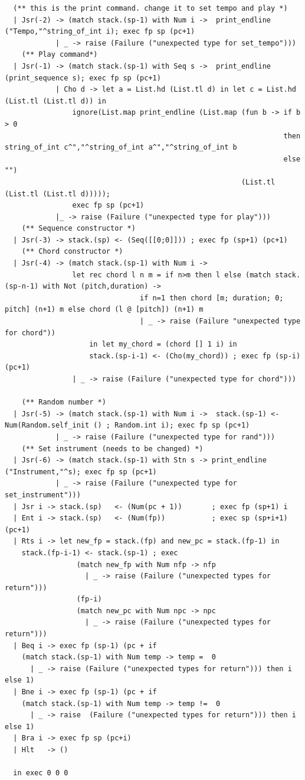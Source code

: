 \documentclass[12pt,A4]{book}
\begin{document}
\begin{verbatim}
  (** this is the print command. change it to set tempo and play *)
  | Jsr(-2) -> (match stack.(sp-1) with Num i ->  print_endline ("Tempo,"^string_of_int i); exec fp sp (pc+1)
            | _ -> raise (Failure ("unexpected type for set_tempo")))
    (** Play command*)
  | Jsr(-1) -> (match stack.(sp-1) with Seq s ->  print_endline (print_sequence s); exec fp sp (pc+1)
            | Cho d -> let a = List.hd (List.tl d) in let c = List.hd (List.tl (List.tl d)) in
                ignore(List.map print_endline (List.map (fun b -> if b > 0 
                                                                  then string_of_int c^","^string_of_int a^","^string_of_int b 
                                                                  else "") 
                                                        (List.tl (List.tl (List.tl d)))));
                exec fp sp (pc+1)
            |_ -> raise (Failure ("unexpected type for play")))
    (** Sequence constructor *)
  | Jsr(-3) -> stack.(sp) <- (Seq([[0;0]])) ; exec fp (sp+1) (pc+1)
    (** Chord constructor *)
  | Jsr(-4) -> (match stack.(sp-1) with Num i ->
                let rec chord l n m = if n>m then l else (match stack.(sp-n-1) with Not (pitch,duration) ->
                                if n=1 then chord [m; duration; 0; pitch] (n+1) m else chord (l @ [pitch]) (n+1) m
                                | _ -> raise (Failure "unexpected type for chord"))
                    in let my_chord = (chord [] 1 i) in
                    stack.(sp-i-1) <- (Cho(my_chord)) ; exec fp (sp-i) (pc+1)
                | _ -> raise (Failure ("unexpected type for chord")))

    (** Random number *)
  | Jsr(-5) -> (match stack.(sp-1) with Num i ->  stack.(sp-1) <- Num(Random.self_init () ; Random.int i); exec fp sp (pc+1)
            | _ -> raise (Failure ("unexpected type for rand")))
    (** Set instrument (needs to be changed) *)
  | Jsr(-6) -> (match stack.(sp-1) with Stn s -> print_endline ("Instrument,"^s); exec fp sp (pc+1)
			| _ -> raise (Failure ("unexpected type for set_instrument")))
  | Jsr i -> stack.(sp)   <- (Num(pc + 1))       ; exec fp (sp+1) i
  | Ent i -> stack.(sp)   <- (Num(fp))           ; exec sp (sp+i+1) (pc+1)
  | Rts i -> let new_fp = stack.(fp) and new_pc = stack.(fp-1) in
    stack.(fp-i-1) <- stack.(sp-1) ; exec 
                 (match new_fp with Num nfp -> nfp  
                   | _ -> raise (Failure ("unexpected types for return"))) 
                 (fp-i) 
                 (match new_pc with Num npc -> npc  
                   | _ -> raise (Failure ("unexpected types for return")))
  | Beq i -> exec fp (sp-1) (pc + if 
    (match stack.(sp-1) with Num temp -> temp =  0 
      | _ -> raise (Failure ("unexpected types for return"))) then i else 1)
  | Bne i -> exec fp (sp-1) (pc + if 
    (match stack.(sp-1) with Num temp -> temp !=  0 
      | _ -> raise  (Failure ("unexpected types for return"))) then i else 1)
  | Bra i -> exec fp sp (pc+i)
  | Hlt   -> ()

  in exec 0 0 0
\end{verbatim}
\end{document}
